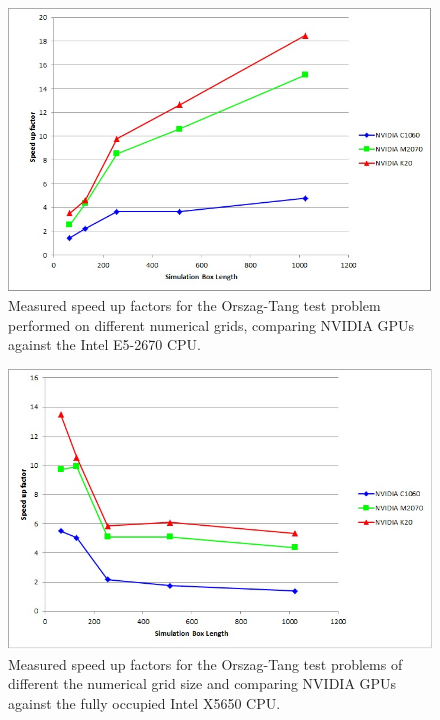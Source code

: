 
\begin{figure}[h]
\includegraphics[scale=0.7]{fig11_E5-2670.JPG}
\caption{Measured speed up factors for the Orszag-Tang test problem performed on different numerical grids, comparing NVIDIA GPUs against the Intel E5-2670 CPU.}
\end{figure}







  


\begin{figure}[h]
\includegraphics[scale=0.7]{fig12_x5650_6c.JPG}
\caption{Measured speed up factors for the Orszag-Tang test problems of different the numerical grid size and  comparing NVIDIA GPUs against the fully occupied Intel X5650 CPU.}
\end{figure}


